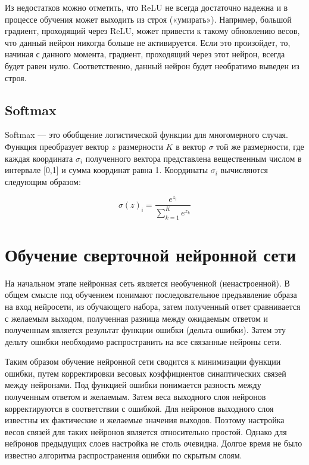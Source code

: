 \documentclass[11pt,colorlinks=true]{article}
\begin{document}
Из недостатков можно отметить, что ReLU не всегда достаточно надежна и в процессе обучения может выходить из строя («умирать»). Например, большой градиент, проходящий через ReLU, может привести к такому обновлению весов, что данный нейрон никогда больше не активируется. Если это произойдет, то, начиная с данного момента, градиент, проходящий через этот нейрон, всегда будет равен нулю. Соответственно, данный нейрон будет необратимо выведен из строя. 

\subsection{Softmax}

Softmax — это обобщение логистической функции для многомерного случая. Функция преобразует вектор $z$ размерности $K$ в вектор $\sigma$ той же размерности, где каждая координата 
$\sigma_{i}$ полученного вектора представлена вещественным числом в интервале [0,1] и сумма координат равна 1. Координаты $\sigma_{i}$ вычисляются следующим образом:

\begin{equation*}
	\sigma(z)_{\mathsf{i}} = \frac{e^{z_{\mathsf{i}}}}{\sum \limits_{k=1}^{K} e^{z_{k}} }
\end{equation*}


\section{Обучение сверточной нейронной сети}

На начальном этапе нейронная сеть является необученной (ненастроенной). В общем смысле под обучением понимают последовательное предъявление образа на вход нейросети, из обучающего набора, затем полученный ответ сравнивается с желаемым выходом, полученная разница между ожидаемым ответом и полученным является результат функции ошибки (дельта ошибки). Затем эту дельту ошибки необходимо распространить на все связанные нейроны сети. 

Таким образом обучение нейронной сети сводится к минимизации функции ошибки, путем корректировки весовых коэффициентов синаптических связей между нейронами. Под функцией ошибки понимается разность между полученным ответом и желаемым.  Затем веса выходного слоя нейронов корректируются в соответствии с ошибкой. Для нейронов выходного слоя известны их фактические и желаемые значения выходов. Поэтому настройка весов связей для таких нейронов является относительно простой. Однако для нейронов предыдущих слоев настройка не столь очевидна. Долгое время не было известно алгоритма распространения ошибки по скрытым слоям.
\end{document}
